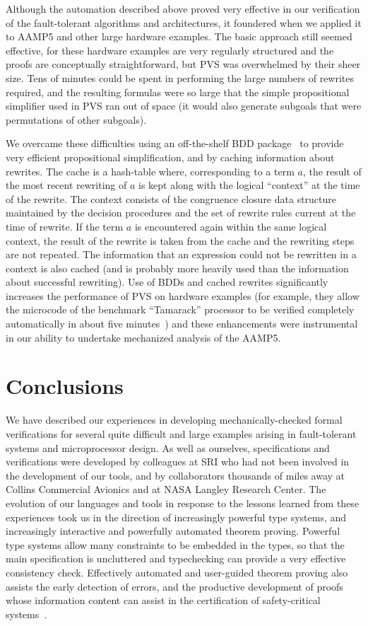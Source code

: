 Although the automation described above proved very effective in our
verification of the fault-tolerant algorithms and architectures, it
foundered when we applied it to AAMP5 and other large hardware
examples.  The basic approach still seemed effective, for these
hardware examples are very regularly structured and the proofs are
conceptually straightforward, but PVS was overwhelmed by their sheer
size.  Tens of minutes could be spent in performing the large numbers
of rewrites required, and the resulting formulas were so large that
the simple propositional simplifier used in PVS ran out of space (it
would also generate subgoals that were permutations of other
subgoals).

We overcame these difficulties using an off-the-shelf BDD
package~\cite{Geert} to provide very efficient propositional
simplification, and by caching information about rewrites.  The cache
is a hash-table where, corresponding to a term $a$, the result of the
most recent rewriting of $a$ is kept along with the logical
``context'' at the time of the rewrite.  The context consists of the
congruence closure data structure maintained by the decision
procedures and the set of rewrite rules current at the time of
rewrite.  If the term $a$ is encountered again within the same logical
context, the result of the rewrite is taken from the cache and the
rewriting steps are not repeated.  The information that an expression
could not be rewritten in a context is also cached (and is probably
more heavily used than the information about successful rewriting).
Use of BDDs and cached rewrites significantly increases the
performance of PVS on hardware examples (for example, they allow the
microcode of the benchmark ``Tamarack'' processor to be verified
completely automatically in about five minutes~\cite{Cyrluk94:TPCD})
and these enhancements were instrumental in our ability to undertake
mechanized analysis of the AAMP5.

\section{Conclusions}
\label{four}

We have described our experiences in developing mechanically-checked
formal verifications for several quite difficult and large examples
arising in fault-tolerant systems and microprocessor design.  As well
as ourselves, specifications and verifications were developed by
colleagues at SRI who had not been involved in the development of our
tools, and by collaborators thousands of miles away at Collins
Commercial Avionics and at NASA Langley Research Center.  The
evolution of our languages and tools in response to the lessons
learned from these experiences took us in the direction of
increasingly powerful type systems, and increasingly interactive and
powerfully automated theorem proving.  Powerful type systems allow
many constraints to be embedded in the types, so that the main
specification is uncluttered and typechecking can provide a very
effective consistency check.  Effectively automated and user-guided
theorem proving also assists the early detection of errors, and the
productive development of proofs whose information content can assist
in the certification of safety-critical systems~\cite{Rushby:FAA}.

